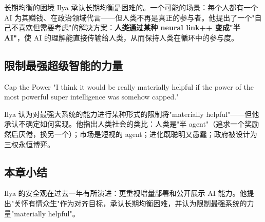 \begin{warningbox}{长期均衡的困境}
Ilya 承认长期均衡是困难的。一个可能的场景：每个人都有一个 AI 为其赚钱、在政治领域代言——但人类不再是真正的参与者。他提出了一个"自己不喜欢但需要考虑"的解决方案：\textbf{人类通过某种 neural link++ 变成"半 AI"}，使 AI 的理解能直接传输给人类，从而保持人类在循环中的参与度。
\end{warningbox}

\subsection{限制最强超级智能的力量}

\begin{importantbox}{Cap the Power}
"I think it would be really materially helpful if the power of the most powerful super intelligence was somehow capped."

Ilya 认为对最强大系统的能力进行某种形式的限制将"materially helpful"——但他承认不确定如何实现。他指出人类社会的类比：人类是"半 agent"（追求一个奖励然后厌倦，换另一个）；市场是短视的 agent；进化既聪明又愚蠢；政府被设计为三权永恒博弈。
\end{importantbox}

\subsection{本章小结}

Ilya 的安全观在过去一年有所演进：更重视增量部署和公开展示 AI 能力。他提出"关怀有情众生"作为对齐目标，承认长期均衡困难，并认为限制最强系统的力量"materially helpful"。


